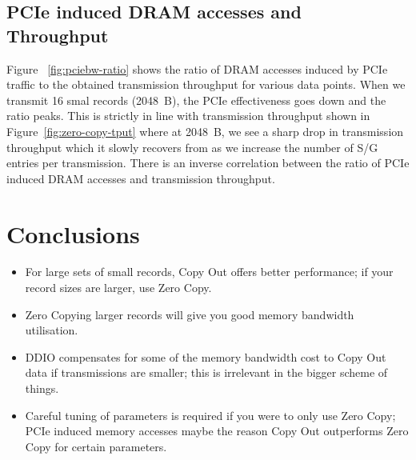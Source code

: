 

\subsection{PCIe induced DRAM accesses and Throughput}
Figure ~\ref{fig:pciebw-ratio} shows the ratio of DRAM accesses induced by PCIe traffic to the obtained transmission throughput for various data points. When we transmit 16 smal records (2048~B),
the PCIe effectiveness goes down and the ratio peaks. This is strictly in line with transmission throughput shown in Figure~\ref{fig:zero-copy-tput} where at 2048~B, we see a sharp drop in transmission 
throughput which it slowly recovers from as we increase the number of S/G entries per transmission. There is an inverse correlation between the ratio of PCIe induced DRAM accesses and transmission throughput.




\section{Conclusions}
\begin{itemize}
\item For large sets of small records, Copy Out offers better performance; if your record sizes are larger, use Zero Copy.
\item Zero Copying larger records will give you good memory bandwidth utilisation.
\item DDIO compensates for some of the memory bandwidth cost to Copy Out data if transmissions are smaller; this is irrelevant in the bigger scheme of things.
\item Careful tuning of parameters is required if you were to only use Zero Copy; PCIe induced memory accesses maybe the reason Copy Out outperforms Zero Copy for certain parameters. 
\end{itemize}

